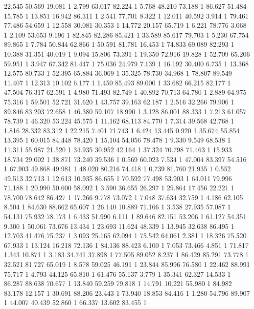 	22.545	50.569	19.081	1
	2.799	63.017	82.224	1
	5.768	48.210	73.188	1
	86.627	51.484	15.785	1
	13.851	16.942	86.311	1
	2.541	77.701	8.322	1
	12.011	40.592	3.914	1
	79.461	77.486	54.659	1
	12.558	30.081	30.353	1
	14.772	20.157	65.719	1
	6.221	78.776	3.068	1
	2.109	53.653	9.196	1
	82.845	82.286	85.421	1
	33.589	85.617	79.703	1
	5.230	67.754	89.865	1
	7.784	50.844	62.866	1
	50.591	81.781	16.453	1
	74.833	69.089	82.293	1
	10.388	31.351	40.019	1
	9.094	15.806	73.391	1
	19.350	72.916	19.828	1
	52.709	65.206	59.951	1
	3.947	67.342	81.447	1
	75.036	24.979	7.139	1
	16.192	30.400	6.735	1
	13.368	12.575	80.733	1
	52.395	65.884	36.069	1
	35.325	78.730	34.968	1
	78.807	89.549	11.407	1
	12.313	10.102	6.177	1
	1.450	85.493	89.000	1
	33.682	66.215	82.177	1
	47.504	76.317	62.591	1
	4.980	71.493	82.749	1
	40.892	70.713	64.780	1
	2.889	64.975	75.316	1
	59.501	52.721	31.620	1
	43.757	39.163	62.187	1
	2.516	32.266	79.906	1
	89.846	83.203	72.658	1
	46.380	59.107	18.990	1
	3.128	86.001	88.333	1
	7.213	61.057	78.739	1
	46.320	53.224	45.575	1
	11.162	68.113	84.770	1
	7.314	39.568	42.768	1
	1.816	28.332	83.312	1
	22.215	7.401	71.743	1
	6.424	13.445	0.920	1
	35.674	55.854	13.395	1
	60.015	84.448	78.420	1
	15.104	54.056	78.478	1
	9.330	9.549	68.538	1
	11.311	55.987	21.520	1
	34.935	30.952	42.164	1
	37.324	70.798	71.463	1
	15.933	18.734	29.002	1
	38.871	73.240	39.536	1
	0.569	60.023	7.534	1
	47.004	83.397	54.516	1
	67.903	49.868	49.981	1
	48.020	80.216	74.418	1
	0.739	81.760	21.935	1
	0.552	49.513	32.713	1
	12.613	10.935	86.655	1
	70.592	77.498	53.903	1
	64.011	79.996	71.188	1
	20.990	50.600	58.092	1
	3.590	36.655	26.297	1
	29.864	17.456	22.221	1
	78.700	78.642	86.427	1
	17.266	9.778	73.072	1
	7.048	37.634	32.759	1
	4.186	62.105	8.504	1
	84.630	88.662	65.607	1
	26.140	10.889	71.166	1
	3.538	27.935	57.087	1
	54.131	75.932	78.173	1
	6.433	51.990	6.111	1
	89.646	82.151	53.206	1
	61.127	54.351	9.300	1
	50.061	73.676	13.434	1
	23.693	11.624	48.339	1
	13.945	32.638	86.495	1
	12.703	41.476	75.237	1
	3.093	25.165	62.094	1
	75.542	64.061	2.381	1
	18.326	75.520	67.933	1
	13.124	16.218	72.136	1
	84.136	88.423	6.100	1
	7.053	73.466	4.851	1
	71.817	1.343	10.871	1
	3.183	34.741	37.898	1
	77.505	89.052	8.237	1
	86.429	85.291	73.778	1
	32.521	81.727	65.019	1
	8.578	59.025	46.191	1
	23.844	85.996	76.580	1
	22.462	88.991	75.717	1
	4.793	44.125	65.810	1
	61.476	55.137	3.779	1
	35.341	62.327	14.533	1
	86.287	88.638	70.677	1
	13.840	59.259	79.818	1
	14.791	10.221	55.980	1
	84.982	83.178	12.157	1
	30.691	88.206	23.443	1
	73.940	18.853	84.416	1
	1.280	54.796	89.907	1
	44.007	40.439	52.860	1
	66.337	13.602	83.455	1
